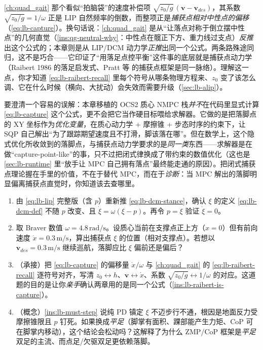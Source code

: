 \begin{insight}\label{ins:lb-raibert-is-capture}
\cref{ch:quad_gait} 那个看似“拍脑袋”的速度补偿项 $\sqrt{z_0/g}\,(\mathbf{v}-\mathbf{v}_{des})$，其系数 $\sqrt{z_0/g}=1/\omega$ 正是 LIP 自然频率的倒数，而整项正是\emph{捕获点相对中性点的偏移}（\cref{eq:lb-capture}）。换句话说：\cref{ch:quad_gait} 是从“让落点对称于倒立摆中性点”的几何直觉（\cref{ins:qg-neutral-why}：中性点在髋正下方、重力线过支点）\emph{反推}出这个公式的；本章则是从 LIP/DCM 动力学\emph{正推}出同一个公式。两条路殊途同归，这不是巧合——它印证了“用落足点控平衡”这件事的底层就是捕获点动力学（Raibert 1986\cite{raibert1986legged} 的落足启发式、Pratt 等\cite{pratt2006capture} 的捕获点框架是同一脉络）。理解这一点，你才知道 \cref{eq:lb-raibert-recall} 里每个符号从哪条物理方程来、$z_0$ 变了该怎么调、它在什么时候（横向、大扰动）会失效而需要升级（\cref{sec:lb-alip}）。
\end{insight}

\begin{remark}\label{rem:lb-implicit-capture}
要澄清一个容易的误解：本章移植的 OCS2 质心 NMPC 栈\emph{并不}在代码里显式计算 \cref{eq:lb-capture} 这个公式，更不会把它当作硬目标喂给求解器。它做的是把落脚点的 XY 坐标作为\emph{优化变量}，在质心动力学 + 摩擦锥 + 步态时序的约束下，让 SQP 自己解出“为了跟踪期望速度且不打滑，脚该落在哪”。但在数学上，这个隐式优化所收敛到的落脚点，与捕获点动力学要求的是\emph{同一类}东西——求解器是在做“capture-point-like”的事，只不过把闭式律换成了带约束的数值优化（这也是 \cref{sec:lb-runtime} 里“放手让 MPC 自己拥有落点”最终能走通的原因）。把闭式捕获点理论握在手里的价值，不在于替代 MPC，而在于\emph{诊断}：当 MPC 解出的落脚明显偏离捕获点直觉时，你知道该去查哪里。
\end{remark}

\begin{practice}
\begin{enumerate}
  \item 由 \cref{eq:lb-lip} 完整版（含 $p$）重新推 \cref{eq:lb-dcm-stance}，确认 $\xi$ 的定义 \cref{eq:lb-dcm-def} 不随 $p$ 改变、且 $\dot\xi=\omega(\xi-p)$。再令 $p=\xi$ 验证 $\dot\xi=0$。
  \item 取 Braver 数值 $\omega=4.8\,\mathrm{rad/s}$。设质心当前在支撑点正上方（$x=0$）但有前向速度 $\dot x=0.3\,\mathrm{m/s}$，算出捕获点 $\xi$ 的位置（相对支撑点）。若想以 $\mathbf{v}_{des}=0.3\,\mathrm{m/s}$ 继续巡航，落脚应比 $\xi$ 偏前还是偏后？
  \item （承接）把 \cref{eq:lb-capture} 的偏移量 $\dot x/\omega$ 与 \cref{ch:quad_gait} 的 \cref{eq:lb-raibert-recall} 逐符号对齐，写清 $z_0\leftrightarrow h$、$\mathbf{v}\leftrightarrow\dot x$、系数 $\sqrt{z_0/g}\leftrightarrow 1/\omega$ 的对应。这道题的目的是让你\emph{亲手}确认两章用的是同一个公式（\cref{ins:lb-raibert-is-capture}）。
  \item （概念）\cref{ins:lb-must-step} 说纯 PD 镇定 $\xi$ 不迈步行不通，根因是地面反力受摩擦锥限且 $p$ 钉死。如果换成\emph{平足}（脚掌有面积、踝部能产生力矩、CoP 可在脚掌内移动），这个结论会松动吗？这解释了为什么 ZMP/CoP 框架是\emph{平足}双足的主流、而点足/欠驱双足更依赖落脚。
\end{enumerate}
\end{practice}

